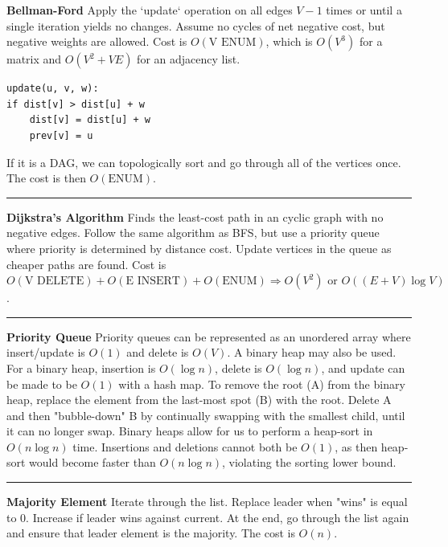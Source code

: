 \documentclass[9pt]{amsart}
\begin{document}
\begin{multicols*}{3}
  \vskip 20pt
  \textbf{Bellman-Ford}
  \newline
  Apply the `update` operation on all edges $V-1$ times or until a single iteration yields no
  changes. Assume no cycles of net negative cost, but negative weights are allowed.
  \newline
  Cost is $O(\text{V ENUM})$, which is $O(V^3)$ for a 
  matrix and $O(V^2 + VE)$ for an adjacency list.
  \begin{lstlisting}
update(u, v, w):
if dist[v] > dist[u] + w
    dist[v] = dist[u] + w
    prev[v] = u
  \end{lstlisting}
  If it is a DAG, we can topologically sort and go through all of the vertices once. The
  cost is then $O(\text{ENUM})$.

  \vskip 7pt
  \hrule
  \vskip 7pt

  \textbf{Dijkstra's Algorithm}
  \newline
  Finds the least-cost path in an cyclic graph with no negative edges. Follow the same
  algorithm as BFS, but use a priority queue where priority is determined by distance
  cost. Update vertices in the queue as cheaper paths are found.
  \newline Cost is 
  $O(\text{V DELETE}) + O(\text{E INSERT}) + O(\text{ENUM})  \Rightarrow O(V^2) \text{ or } O((E + V) \log V)$.
  
  \vskip 7pt
  \hrule
  \vskip 7pt

  \textbf{Priority Queue}
  \newline
  Priority queues can be represented as an unordered array where insert/update is $O(1)$ and
  delete is $O(V)$.
  \vskip 5pt
  A binary heap may also be used. For a binary heap, insertion is $O(\log n)$, delete
  is $O(\log n)$, and update can be made to be $O(1)$ with a hash map. To remove the
  root (A) from the binary heap, replace the element from the last-most spot (B) with the root.
  Delete A and then "bubble-down" B by continually swapping with the smallest child, 
  until it can no longer swap.
  \vskip 5pt
  Binary heaps allow for us to perform a heap-sort in $O(n \log n)$ time. Insertions
  and deletions cannot both be $O(1)$, as then heap-sort would become faster than
  $O(n \log n)$, violating the sorting lower bound.

  \vskip 7pt
  \hrule
  \vskip 7pt

  \textbf{Majority Element}
  \newline
  Iterate through the list. Replace leader when "wins" is equal to 0. Increase
  if leader wins against current. At the end, go through the list again and ensure that 
  leader element is the majority. The cost is $O(n)$.



\end{multicols*}
\pagebreak
\end{document}
